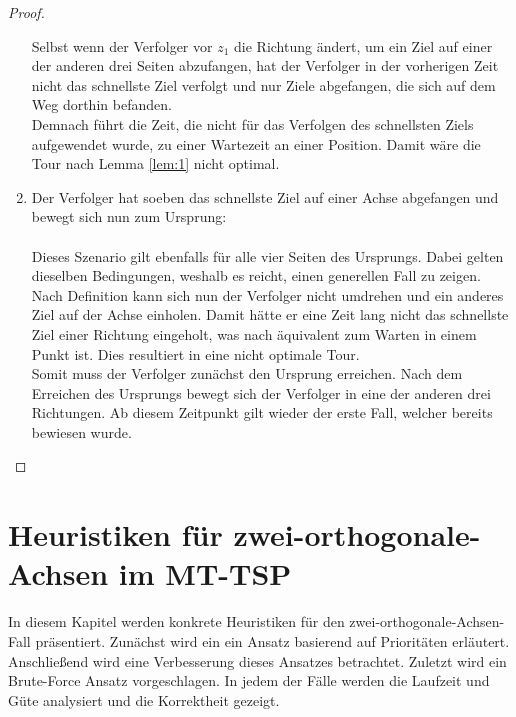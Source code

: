 \documentclass[german,version-2019-11]{uzl-thesis}
\begin{document}
\begin{proof}
\begin{enumerate}
Selbst wenn der Verfolger vor $z_1$ die Richtung ändert, um ein Ziel auf einer der anderen drei Seiten abzufangen, hat der Verfolger in der vorherigen Zeit nicht das schnellste Ziel verfolgt und nur Ziele abgefangen, die sich auf dem Weg dorthin befanden. \\
Demnach führt die Zeit, die nicht für das Verfolgen des schnellsten Ziels aufgewendet wurde, zu einer Wartezeit an einer Position. Damit wäre die Tour nach Lemma \ref{lem:1} nicht optimal.\\

\item 
Der Verfolger hat soeben das schnellste Ziel auf einer Achse abgefangen und bewegt sich nun zum Ursprung:\\\\\noindent
Dieses Szenario gilt ebenfalls für alle vier Seiten des Ursprungs. Dabei gelten dieselben Bedingungen, weshalb es reicht, einen generellen Fall zu zeigen. \\
Nach Definition kann sich nun der Verfolger nicht umdrehen und ein anderes Ziel auf der Achse einholen. Damit hätte er eine Zeit lang nicht das schnellste Ziel einer Richtung eingeholt, was  nach \cite{helvig} äquivalent zum Warten in einem Punkt ist. Dies resultiert in eine nicht optimale Tour.\\
Somit muss der Verfolger zunächst den Ursprung erreichen. Nach dem Erreichen des Ursprungs bewegt  sich der Verfolger in eine der anderen drei Richtungen. Ab diesem Zeitpunkt gilt wieder der erste Fall, welcher bereits bewiesen wurde.
\end{enumerate} \noindent
\end{proof}


\chapter{Heuristiken für zwei-orthogonale-Achsen im MT-TSP}
\label{kap4}
In diesem Kapitel werden konkrete Heuristiken für den zwei-orthogonale-Achsen-Fall präsentiert. Zunächst wird ein ein Ansatz basierend auf Prioritäten erläutert. Anschließend wird eine Verbesserung dieses Ansatzes betrachtet. Zuletzt wird ein Brute-Force Ansatz vorgeschlagen. In jedem der Fälle werden die Laufzeit und Güte analysiert und die Korrektheit gezeigt.
\end{document}
